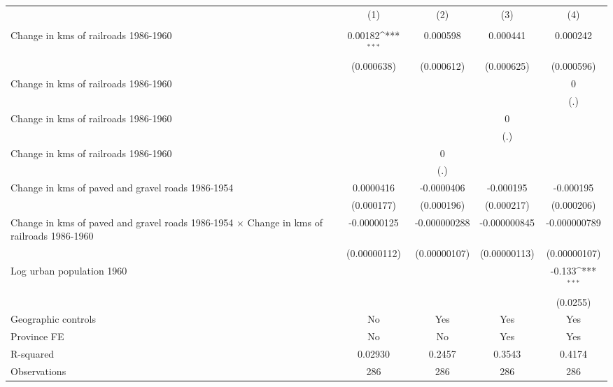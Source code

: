 {
\def\sym#1{\ifmmode^{#1}\else\(^{#1}\)\fi}
\begin{tabular}{l*{4}{c}}
\hline\hline
                &\multicolumn{1}{c}{(1)}&\multicolumn{1}{c}{(2)}&\multicolumn{1}{c}{(3)}&\multicolumn{1}{c}{(4)}\\
                &\multicolumn{1}{c}{}&\multicolumn{1}{c}{}&\multicolumn{1}{c}{}&\multicolumn{1}{c}{}\\
\hline
Change in kms of railroads 1986-1960&  0.00182\sym{***}& 0.000598         & 0.000441         & 0.000242         \\
                &(0.000638)         &(0.000612)         &(0.000625)         &(0.000596)         \\
[1em]
Change in kms of railroads 1986-1960&                  &                  &                  &        0         \\
                &                  &                  &                  &      (.)         \\
[1em]
Change in kms of railroads 1986-1960&                  &                  &        0         &                  \\
                &                  &                  &      (.)         &                  \\
[1em]
Change in kms of railroads 1986-1960&                  &        0         &                  &                  \\
                &                  &      (.)         &                  &                  \\
[1em]
Change in kms of paved and gravel roads 1986-1954&0.0000416         &-0.0000406         &-0.000195         &-0.000195         \\
                &(0.000177)         &(0.000196)         &(0.000217)         &(0.000206)         \\
[1em]
Change in kms of paved and gravel roads 1986-1954 $\times$ Change in kms of railroads 1986-1960&-0.00000125         &-0.000000288         &-0.000000845         &-0.000000789         \\
                &(0.00000112)         &(0.00000107)         &(0.00000113)         &(0.00000107)         \\
[1em]
Log urban population 1960&                  &                  &                  &   -0.133\sym{***}\\
                &                  &                  &                  & (0.0255)         \\
\hline
Geographic controls&       No         &      Yes         &      Yes         &      Yes         \\
Province FE     &       No         &       No         &      Yes         &      Yes         \\
R-squared       &  0.02930         &   0.2457         &   0.3543         &   0.4174         \\
Observations    &      286         &      286         &      286         &      286         \\
\hline\hline
\end{tabular}
}
